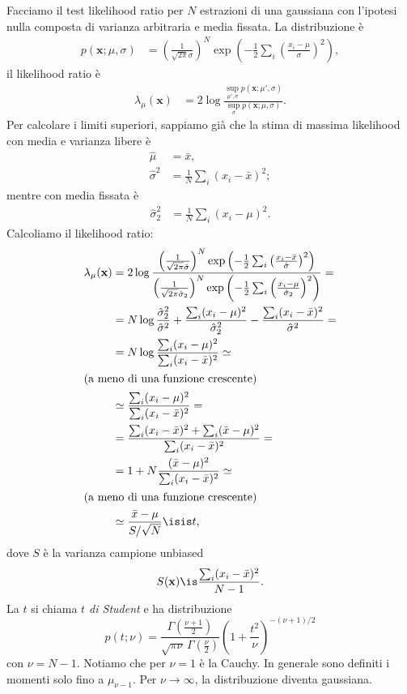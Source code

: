 
Facciamo il test likelihood ratio per $N$ estrazioni di una gaussiana
con l'ipotesi nulla composta di varianza arbitraria e media fissata.
La distribuzione è
\begin{align*}
	p(\mathbf x;\mu,\sigma)
	&= \left(\frac1{\sqrt{2\pi}\sigma}\right)^N
	\exp \left( -\frac12 \sum_i \left(\frac{x_i-\mu}{\sigma}\right)^2 \right),
\end{align*}
il likelihood ratio è
\begin{align*}
	\lambda_\mu(\mathbf x)
	&= 2\log \frac
	{\sup\limits_{\mu',\sigma} p(\mathbf x;\mu',\sigma)}
	{\sup\limits_{\sigma} p(\mathbf x;\mu,\sigma)}.
\end{align*}
Per calcolare i limiti superiori,
sappiamo già che la stima di massima likelihood con media e varianza libere è
\begin{align*}
	\hat\mu
	&= \bar x, \\
	\hat\sigma^2
	&= \frac 1N \sum_i (x_i-\bar x)^2;
\end{align*}
mentre con media fissata è
\begin{align*}
	\hat\sigma_2^2
	&= \frac 1N \sum_i (x_i-\mu)^2.
\end{align*}
Calcoliamo il likelihood ratio:
\begin{align*}
	\lambda_\mu(\mathbf x)
	&= 2\log \frac
	{\left(\frac1{\sqrt{2\pi}\hat\sigma}\right)^N
	\exp \left( -\frac12 \sum_i \left(\frac{x_i-\bar x}{\hat\sigma}\right)^2 \right)}
	{\left(\frac1{\sqrt{2\pi}\hat\sigma_2}\right)^N
	\exp \left( -\frac12 \sum_i \left(\frac{x_i-\mu}{\hat\sigma_2}\right)^2 \right)} = \\
	&= N \log \frac{\hat\sigma_2^2}{\hat\sigma^2}
	+ \frac{\sum_i (x_i-\mu)^2}{\hat\sigma_2^2}
	- \frac{\sum_i (x_i-\bar x)^2}{\hat\sigma^2} = \\
	&= N \log \frac
	{\sum_i (x_i - \mu)^2}
	{\sum_i (x_i - \bar x)^2} \simeq \\
	\intertext{(a meno di una funzione crescente)}
	&\simeq \frac
	{\sum_i (x_i - \mu)^2}
	{\sum_i (x_i - \bar x)^2} = \\
	&= \frac
	{\sum_i (x_i - \bar x)^2 + \sum_i (\bar x-\mu)^2}
	{\sum_i (x_i - \bar x)^2} = \\
	&= 1 + N \frac {(\bar x-\mu)^2} {\sum_i (x_i-\bar x)^2} \simeq \\
	\intertext{(a meno di una funzione crescente)}
	&\simeq \frac{\bar x - \mu}{S/\sqrt N} \isis t,
\end{align*}
dove $S$ è la varianza campione unbiased
\begin{equation*}
	S(\mathbf x)
	\is \frac {\sum_i (x_i-\bar x)^2} {N-1}.
\end{equation*}
La $t$ si chiama \emph{$t$ di Student} e ha distribuzione
\begin{equation*}
	p(t;\nu)
	= \frac {\Gamma\left(\frac{\nu+1}2\right)} {\sqrt{\pi\nu}\, \Gamma\left(\frac\nu2\right)}
	\left(1+\frac{t^2}\nu\right)^{-(\nu+1)/2}
\end{equation*}
con $\nu=N-1$.
Notiamo che per $\nu=1$ è la Cauchy.
In generale sono definiti i momenti solo fino a $\mu_{\nu-1}$.
Per $\nu\to\infty$, la distribuzione diventa gaussiana.

